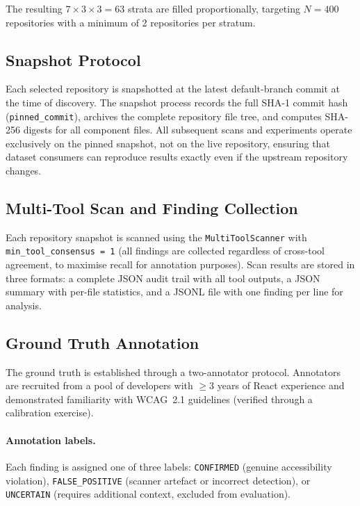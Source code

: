 The resulting $7 \times 3 \times 3 = 63$ strata are filled proportionally,
targeting $N = 400$ repositories with a minimum of 2 repositories per stratum.

\subsection{Snapshot Protocol}

Each selected repository is snapshotted at the latest default-branch commit
at the time of discovery.  The snapshot process records the full SHA-1 commit
hash (\texttt{pinned\_commit}), archives the complete repository file tree,
and computes SHA-256 digests for all component files.  All subsequent scans
and experiments operate exclusively on the pinned snapshot, not on the live
repository, ensuring that dataset consumers can reproduce results exactly
even if the upstream repository changes.

\subsection{Multi-Tool Scan and Finding Collection}

Each repository snapshot is scanned using the \texttt{MultiToolScanner} with
\texttt{min\_tool\_consensus = 1} (all findings are collected regardless of
cross-tool agreement, to maximise recall for annotation purposes).  Scan
results are stored in three formats: a complete JSON audit trail with all
tool outputs, a JSON summary with per-file statistics, and a JSONL file with
one finding per line for analysis.

\subsection{Ground Truth Annotation}

The ground truth is established through a two-annotator protocol.  Annotators
are recruited from a pool of developers with $\geq$3 years of React experience
and demonstrated familiarity with WCAG~2.1 guidelines (verified through a
calibration exercise).

\paragraph{Annotation labels.}  Each finding is assigned one of three labels:
\texttt{CONFIRMED} (genuine accessibility violation), \texttt{FALSE\_POSITIVE}
(scanner artefact or incorrect detection), or \texttt{UNCERTAIN} (requires
additional context, excluded from evaluation).

